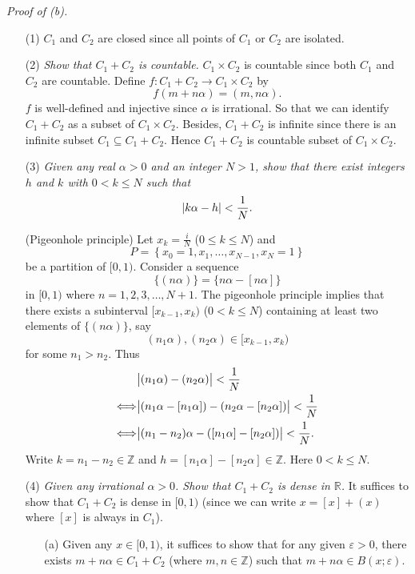 \documentclass{article}
\begin{document}
\emph{Proof of (b).}
\begin{enumerate}
\item[(1)]
$C_1$ and $C_2$ are closed
since all points of $C_1$ or $C_2$ are isolated.

\item[(2)]
\emph{Show that $C_1+C_2$ is countable.}
$C_1 \times C_2$ is countable since both $C_1$ and $C_2$ are countable.
Define $f: C_1 + C_2 \to C_1 \times C_2$ by
\[
  f(m+n\alpha) = (m,n\alpha).
\]
$f$ is well-defined and injective since $\alpha$ is irrational.
So that we can identify $C_1 + C_2$ as a subset of $C_1 \times C_2$.
Besides, $C_1 + C_2$ is infinite since there is an infinite subset $C_1 \subseteq C_1 + C_2$.
Hence $C_1+C_2$ is countable subset of $C_1 \times C_2$.

\item[(3)]
  \emph{Given any real $\alpha > 0$ and an integer $N > 1$,
  show that there exist integers $h$ and $k$ with $0 < k \leq N$ such that
  \[
    \abs{ k\alpha - h } < \frac{1}{N}.
  \]}

  (Pigeonhole principle)
  Let
  $x_k = \frac{i}{N}$ ($0 \leq k \leq N$) and
  \[
    P = \left\{ x_0 = 1, x_1, \ldots, x_{N-1}, x_N = 1\right\}
  \]
  be a partition of $[0,1)$.
  Consider a sequence
  \[
    \{ (n\alpha) \} = \{ n\alpha - [n\alpha] \}
  \]
  in $[0,1)$
  where $n = 1,2,3,\ldots,N+1$.
  The pigeonhole principle implies that there exists a subinterval $[x_{k-1},x_k)$
  ($0 < k \leq N$)
  containing at least two elements of $\{ (n\alpha) \}$,
  say
  \[
    (n_1\alpha), (n_2\alpha) \in [x_{k-1},x_k)
  \]
  for some $n_1 > n_2$.
  Thus
  \begin{align*}
    &\abs{ (n_1\alpha) - (n_2\alpha) } < \frac{1}{N} \\
    \Longleftrightarrow&
    \abs{ ( n_1\alpha - [n_1\alpha] ) - ( n_2\alpha - [n_2\alpha] ) } < \frac{1}{N} \\
    \Longleftrightarrow&
    \abs{ (n_1-n_2)\alpha - ([n_1\alpha]-[n_2\alpha]) } < \frac{1}{N}.
  \end{align*}
  Write $k = n_1-n_2 \in \mathbb{Z}$ and $h = [n_1\alpha]-[n_2\alpha] \in \mathbb{Z}$.
  Here $0 < k \leq N$.

\item[(4)]
\emph{Given any irrational $\alpha > 0$.
Show that $C_1+C_2$ is dense in $\mathbb{R}$.}
  It suffices to show that $C_1+C_2$ is dense in $[0,1)$
  (since we can write $x = [x] + (x)$ where $[x]$ is always in $C_1$).
  \begin{enumerate}
  \item[(a)]
  Given any $x \in [0,1)$, it suffices to show that
  for any given $\varepsilon > 0$, there exists $m+n\alpha \in C_1+C_2$
  (where $m, n \in \mathbb{Z}$)
  such that $m+n\alpha \in B(x;\varepsilon)$.


\end{enumerate}
\end{enumerate}
\end{document}
